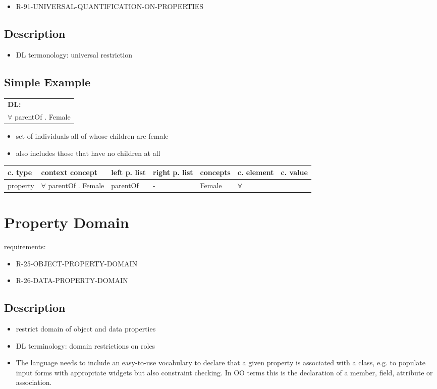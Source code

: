 \documentclass{llncs}
\newenvironment{gcotable}{
  \scriptsize
  \sffamily
  \vspace{0.3cm}
  \begin{tabular}{l|l|l|l|l|l|l}
  \hline
  \textbf{c. type} & \textbf{context concept} & \textbf{left p. list} & \textbf{right p. list} & \textbf{concepts} & \textbf{c. element} & \textbf{c. value} \\
  \hline

}{
  \hline
  \end{tabular}
  \linebreak
}
\newenvironment{DL}{
  \scriptsize
  \sffamily
  \vspace{0.3cm}
  \begin{tabular}{l}
	\textbf{DL:} \\

}{
  \end{tabular}
  \linebreak
}
\newcommand{\tb}[1]{\todo[size=\small, color=blue!40]{\textbf{Thomas:} #1}}
\begin{document}
\begin{itemize}
	\item R-91-UNIVERSAL-QUANTIFICATION-ON-PROPERTIES
\end{itemize}

\subsection{Description}

\begin{itemize}
	\item DL termonology: universal restriction
\end{itemize}

\tb{definition}

\subsection{Simple Example}

\begin{DL}
$\forall$ parentOf . Female
\end{DL}

\begin{itemize}
	\item set of individuals all of whose children are female
  \item also includes those that have no children at all
\end{itemize}

\begin{gcotable}
property & $\forall$ parentOf . Female & parentOf & - & Female & $\forall$ \\
\end{gcotable}

\section{Property Domain}

requirements:

\begin{itemize}
	\item R-25-OBJECT-PROPERTY-DOMAIN
	\item R-26-DATA-PROPERTY-DOMAIN
\end{itemize}

\subsection{Description}

\begin{itemize}
	\item restrict domain of object and data properties
	\item DL terminology: domain restrictions on roles
	\item The language needs to include an easy-to-use vocabulary to declare that a given property is associated with a class, e.g. to populate input forms with appropriate widgets but also constraint checking. In OO terms this is the declaration of a member, field, attribute or association. 
\end{itemize}
\end{document}
